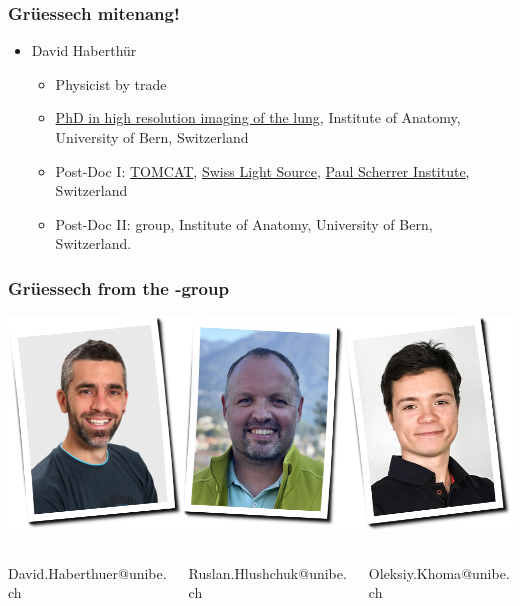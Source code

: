 
\begin{frame}
	\frametitle{Grüessech mitenang!}
	\begin{itemize}
		\item David Haberthür
		\begin{itemize}
			\item Physicist by trade
			\item \href{https://boris.unibe.ch/2619/}{PhD in high resolution imaging of the lung}, Institute of Anatomy, University of Bern, Switzerland
			\item Post-Doc I: \href{https://www.psi.ch/sls/tomcat/}{TOMCAT}, \href{https://www.psi.ch/sls/}{Swiss Light Source}, \href{https://www.psi.ch/}{Paul Scherrer Institute}, Switzerland
			\item Post-Doc II: \uct group, Institute of Anatomy, University of Bern, Switzerland.
		\end{itemize}
	\end{itemize}
\end{frame}

\begin{frame}
	\frametitle{Grüessech from the \uct-group}
	\centering
	\includegraphics[width=0.9\linewidth]{./images/team}
		\begin{columns}
		\hfill\begin{column}{0.3\linewidth}
			\centering%
			David{\color{ubRed!61.8}.}Haberthuer{\color{ubRed!61.8}@unibe.ch}%
		\end{column}
		\begin{column}{0.3\linewidth}
			\centering%
			Ruslan{\color{ubRed!61.8}.}Hlushchuk{\color{ubRed!61.8}@unibe.ch}%
		\end{column}
		\begin{column}{0.3\linewidth}
			\centering%
			Oleksiy{\color{ubRed!61.8}.}Khoma{\color{ubRed!61.8}@unibe.ch}%
		\end{column}\hfill%
	\end{columns}
\end{frame}

